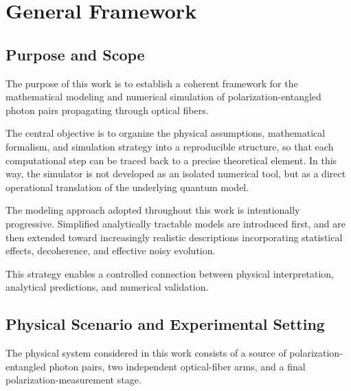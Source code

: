 
\chapter{General Framework}


\section{Purpose and Scope}

The purpose of this work is to establish a coherent framework for the mathematical modeling and numerical simulation of polarization-entangled photon pairs propagating through optical fibers.

The central objective is to organize the physical assumptions, mathematical formalism, and simulation strategy into a reproducible structure, so that each computational step can be traced back to a precise theoretical element. In this way, the simulator is not developed as an isolated numerical tool, but as a direct operational translation of the underlying quantum model.

\medskip

The modeling approach adopted throughout this work is intentionally progressive. Simplified analytically tractable models are introduced first, and are then extended toward increasingly realistic descriptions incorporating statistical effects, decoherence, and effective noisy evolution.

This strategy enables a controlled connection between physical interpretation, analytical predictions, and numerical validation.


\section{Physical Scenario and Experimental Setting}

The physical system considered in this work consists of a source of polarization-entangled photon pairs, two independent optical-fiber arms, and a final polarization-measurement stage.

